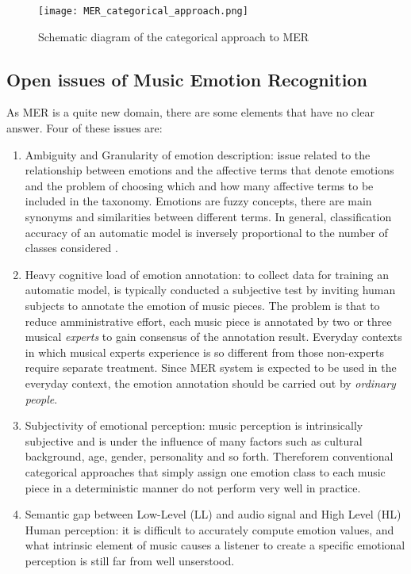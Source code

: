 \begin{figure}[h]
    \centering
    \texttt{[image: MER\_categorical\_approach.png]} 
	\caption{Schematic diagram of the categorical approach to MER}
    \label{fig:MER_categorical_approach}
\end{figure}

\subsection{Open issues of Music Emotion Recognition}
As MER is a quite new domain, there are some elements that have no clear answer. Four of these issues are:
\begin{enumerate}
	\item Ambiguity and Granularity of emotion description: issue related to the relationship between emotions and the affective terms that denote emotions and the problem of choosing which and how many affective terms to be included in the taxonomy. Emotions are fuzzy concepts, there are main synonyms and similarities between different terms. In general, classification accuracy of an automatic model is inversely proportional to the number of classes considered \cite{van2006emotion}.
	\item Heavy cognitive load of emotion annotation: to collect data for training an automatic model, is typically conducted a subjective test by inviting human subjects to annotate the emotion of music pieces. The problem is that to reduce amministrative effort, each music piece is annotated by two or three musical \textit{experts} to gain consensus of the annotation result. Everyday contexts in which musical experts experience is so different from those non-experts require separate treatment. Since MER system is expected to be used in the everyday context, the emotion annotation should be carried out by \textit{ordinary people}.
	\item Subjectivity of emotional perception: music perception is intrinsically subjective and is under the influence of many factors such as cultural background, age, gender, personality and so forth. Thereforem conventional categorical approaches that simply assign one emotion class to each music piece in a deterministic manner do not perform very well in practice.
	\item Semantic gap between Low-Level (LL) and audio signal and High Level (HL) Human perception: it is difficult to accurately compute emotion values, and what intrinsic element of music causes a listener to create a specific emotional perception is still far from well unserstood.
\end{enumerate}

